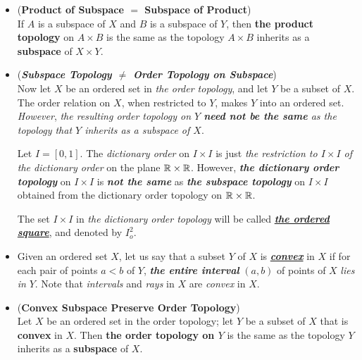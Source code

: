 \documentclass[11pt]{article}
\begin{document}
\begin{itemize}
\item \begin{proposition} (\textbf{Product of Subspace $=$ Subspace of Product}) \citep{munkres2000topology}\\
If $A$ is a subspace of $X$ and $B$ is a subspace of $Y$, then \textbf{the product topology} on $A \times B$ is the same as the topology $A \times B$ inherits as a \textbf{subspace} of $X \times Y$.
\end{proposition}


\item \begin{remark} (\emph{\textbf{Subspace Topology  $\neq$ Order Topology on Subspace}})\\
Now let $X$ be an ordered set in \emph{the order topology}, and let $Y$ be a subset of $X$. The order relation on $X$, when restricted to $Y$, makes $Y$ into an ordered set. \emph{However}, \emph{the resulting order topology on $Y$ \textbf{need not be the same} as the topology that $Y$ inherits as a subspace of $X$}.

Let $I= [0, 1]$. The \emph{dictionary order} on $I \times I$ is just \emph{the restriction to $I \times I$ of the dictionary order} on the plane ${\mathbb R} \times {\mathbb R}$. However, \emph{\textbf{the dictionary order topology}} on $I \times I$ is \emph{\textbf{not the same}} as \emph{\textbf{the subspace topology}} on $I \times I$ obtained from the dictionary order topology on ${\mathbb R} \times {\mathbb R}$.  

The set $I \times I$ in \emph{the dictionary order topology} will be called \underline{\emph{\textbf{the ordered square}}}, and denoted by $I_o^2$.
\end{remark}

\item \begin{definition}
Given an ordered set $X$, let us say that a subset $Y$ of $X$ is \underline{\emph{\textbf{convex}}} in $X$ if for each pair of points $a < b$ of $Y$, \emph{\textbf{the entire interval}} $(a, b)$ of points of $X$ \emph{lies in} $Y$. Note that \emph{intervals} and \emph{rays} in $X$ are \emph{convex} in $X$.
\end{definition}

\item \begin{proposition} (\textbf{Convex Subspace Preserve Order Topology})\citep{munkres2000topology}\\
Let $X$ be an ordered set in the order topology; let $Y$ be a subset of $X$ that is \textbf{convex} in $X$. Then \textbf{the order topology on $Y$} is the same as the topology $Y$ inherits as a \textbf{subspace} of $X$.
\end{proposition}

\end{itemize}
\end{document}
